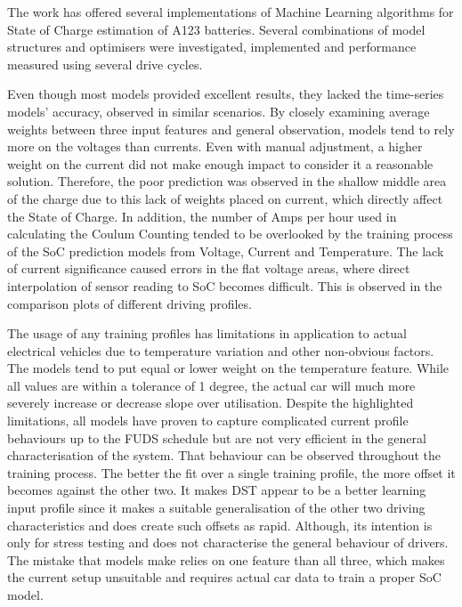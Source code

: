 The work has offered several implementations of Machine Learning algorithms for State of Charge estimation of A123 batteries.
Several combinations of model structures and optimisers were investigated, implemented and performance measured using several drive cycles.

%
%
Even though most models provided excellent results, they lacked the time-series models' accuracy, observed in similar scenarios. 
By closely examining average weights between three input features and general observation, models tend to rely more on the voltages than currents.
Even with manual adjustment, a higher weight on the current did not make enough impact to consider it a reasonable solution. 
Therefore, the poor prediction was observed in the shallow middle area of the charge due to this lack of weights placed on current, which directly affect the State of Charge.
In addition, the number of Amps per hour used in calculating the Coulum Counting tended to be overlooked by the training process of the SoC prediction models from Voltage, Current and Temperature.
The lack of current significance caused errors in the flat voltage areas, where direct interpolation of sensor reading to SoC becomes difficult.
This is observed in the comparison plots of different driving profiles. 

%
%
The usage of any training profiles has limitations in application to actual electrical vehicles due to temperature variation and other non-obvious factors.
The models tend to put equal or lower weight on the temperature feature.
While all values are within a tolerance of 1 degree, the actual car will much more severely increase or decrease slope over utilisation.
Despite the highlighted limitations, all models have proven to capture complicated current profile behaviours up to the FUDS schedule but are not very efficient in the general characterisation of the system.
That behaviour can be observed throughout the training process.
The better the fit over a single training profile, the more offset it becomes against the other two.
It makes DST appear to be a better learning input profile since it makes a suitable generalisation of the other two driving characteristics and does create such offsets as rapid.
Although, its intention is only for stress testing and does not characterise the general behaviour of drivers.
The mistake that models make relies on one feature than all three, which makes the current setup unsuitable and requires actual car data to train a proper SoC model.

